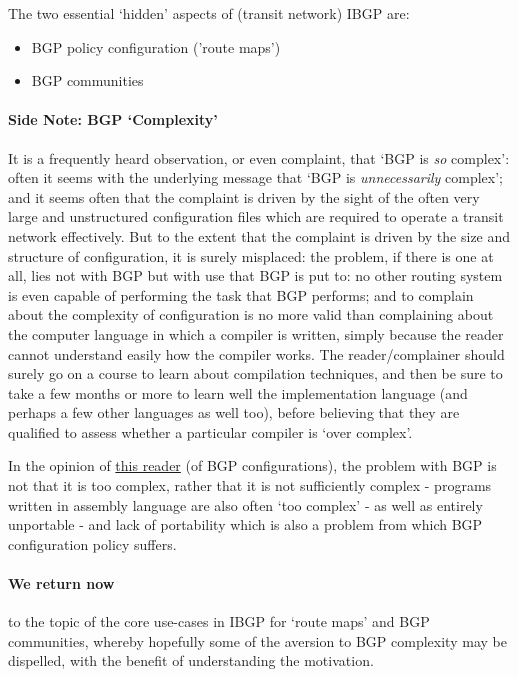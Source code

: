 The two essential `hidden' aspects of (transit network) IBGP are:
\begin{itemize}
	\item BGP policy configuration ('route maps')
	\item BGP communities
\end{itemize}

\paragraph{Side Note: BGP `Complexity'}

It is a frequently heard observation, or even complaint, that `BGP is \textit{so} complex': often it seems with the underlying message that `BGP is \textit{unnecessarily} complex'; and it seems often that the complaint is driven by the sight of the often very large and unstructured configuration files which are required to operate a transit network effectively.  But to the extent that the complaint is driven by the size and structure of configuration, it is surely misplaced: the problem, if there is one at all, lies not with BGP but with use that BGP is put to: no other routing system is even capable of performing the task that BGP performs; and to complain about the complexity of configuration is no more valid than complaining about the computer language in which a compiler is written, simply because the reader cannot understand easily how the compiler works.
The reader/complainer should surely go on a course to learn about compilation techniques, and then be sure to take a few months or more to learn well the implementation language (and perhaps a few other languages as well too), before believing that they are qualified to assess whether a particular compiler is `over complex'.

In the opinion of \underline{this reader} (of BGP configurations), the problem with BGP is not that it is too complex, rather that it is not sufficiently complex - programs written in assembly language are also often `too complex' - as well as entirely unportable - and lack of portability which is also a problem from which BGP configuration policy suffers.

\bigskip

\paragraph{We return now}
to the topic of the core use-cases in IBGP for `route maps' and BGP communities, whereby hopefully some of the aversion to BGP complexity may be dispelled, with the benefit of understanding the motivation.

